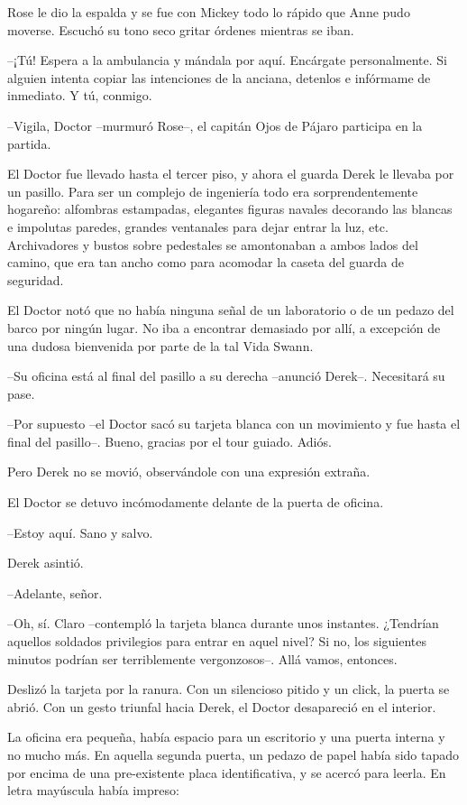 {Rose le dio la espalda y se fue con Mickey todo lo rápido que Anne pudo
moverse. Escuchó su tono seco gritar órdenes mientras se iban.}

{--¡Tú! Espera a la ambulancia y mándala por aquí. Encárgate
 personalmente. Si alguien intenta copiar las intenciones de la anciana,
detenlos e infórmame de inmediato. Y tú, conmigo.}

{--Vigila, Doctor --murmuró Rose--, el capitán Ojos de Pájaro participa
en la partida.}

\mbox{}

{El Doctor fue llevado hasta el tercer piso, y ahora el guarda Derek le
 llevaba por un pasillo. Para ser un complejo de ingeniería todo era
 sorprendentemente hogareño: alfombras estampadas, elegantes figuras
 navales decorando las blancas e impolutas paredes, grandes ventanales
 para dejar entrar la luz, etc. Archivadores y bustos sobre pedestales se
 amontonaban a ambos lados del camino, que era tan ancho como para
acomodar la caseta del guarda de seguridad.}

{El Doctor notó que no había ninguna señal de un laboratorio o de un
 pedazo del barco por ningún lugar. No iba a encontrar demasiado por
 allí, a excepción de una dudosa bienvenida por parte de la tal Vida
Swann.}

{--Su oficina está al final del pasillo a su derecha --anunció Derek--.
Necesitará su pase.}

{--Por supuesto --el Doctor sacó su tarjeta blanca con un movimiento y
 fue hasta el final del pasillo--. Bueno, gracias por el tour guiado.
Adiós.}

{Pero Derek no se movió, observándole con una expresión extraña.}

{El Doctor se detuvo incómodamente delante de la puerta de oficina.}

{--Estoy aquí. Sano y salvo.}

{Derek asintió.}

{--Adelante, señor.}

{--Oh, sí. Claro --contempló la tarjeta blanca durante unos instantes.
 ¿Tendrían aquellos soldados privilegios para entrar en aquel nivel? Si
 no, los siguientes minutos podrían ser terriblemente vergonzosos--. Allá
vamos, entonces.}

{Deslizó la tarjeta por la ranura. Con un silencioso pitido y un click,
 la puerta se abrió. Con un gesto triunfal hacia Derek, el Doctor
desapareció en el interior.}

{La oficina era pequeña, había espacio para un escritorio y una puerta
 interna y no mucho más. En aquella segunda puerta, un pedazo de papel
 había sido tapado por encima de una pre-existente placa identificativa,
y se acercó para leerla. En letra mayúscula había impreso:}

